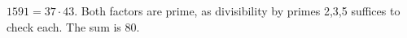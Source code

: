 $1591=37\cdot43$. Both factors are prime, as divisibility by primes 2,3,5 suffices to check each. The sum is $\boxed{80}$.
